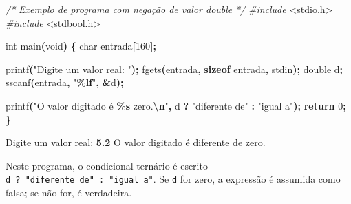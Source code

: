 \documentclass[
  11pt,
  a4paper,
]{scrbook}
\newenvironment{Shaded}{\begin{snugshade}}{\end{snugshade}}
\newcommand{\CommentTok}[1]{\textcolor[rgb]{0.56,0.35,0.01}{\textit{#1}}}
\newcommand{\ControlFlowTok}[1]{\textcolor[rgb]{0.13,0.29,0.53}{\textbf{#1}}}
\newcommand{\DataTypeTok}[1]{\textcolor[rgb]{0.13,0.29,0.53}{#1}}
\newcommand{\DecValTok}[1]{\textcolor[rgb]{0.00,0.00,0.81}{#1}}
\newcommand{\ImportTok}[1]{#1}
\newcommand{\KeywordTok}[1]{\textcolor[rgb]{0.13,0.29,0.53}{\textbf{#1}}}
\newcommand{\NormalTok}[1]{#1}
\newcommand{\OperatorTok}[1]{\textcolor[rgb]{0.81,0.36,0.00}{\textbf{#1}}}
\newcommand{\PreprocessorTok}[1]{\textcolor[rgb]{0.56,0.35,0.01}{\textit{#1}}}
\newcommand{\SpecialCharTok}[1]{\textcolor[rgb]{0.81,0.36,0.00}{\textbf{#1}}}
\newcommand{\StringTok}[1]{\textcolor[rgb]{0.31,0.60,0.02}{#1}}
\begin{document}
\begin{Shaded}
\begin{Highlighting}[]
\CommentTok{/*}
\CommentTok{Exemplo de programa com negação de valor double}
\CommentTok{*/}
\PreprocessorTok{\#include }\ImportTok{\textless{}stdio.h\textgreater{}}
\PreprocessorTok{\#include }\ImportTok{\textless{}stdbool.h\textgreater{}}

\DataTypeTok{int}\NormalTok{ main}\OperatorTok{(}\DataTypeTok{void}\OperatorTok{)} \OperatorTok{\{}
    \DataTypeTok{char}\NormalTok{ entrada}\OperatorTok{[}\DecValTok{160}\OperatorTok{];}

\NormalTok{    printf}\OperatorTok{(}\StringTok{"Digite um valor real: "}\OperatorTok{);}
\NormalTok{    fgets}\OperatorTok{(}\NormalTok{entrada}\OperatorTok{,} \KeywordTok{sizeof}\NormalTok{ entrada}\OperatorTok{,}\NormalTok{ stdin}\OperatorTok{);}
    \DataTypeTok{double}\NormalTok{ d}\OperatorTok{;}
\NormalTok{    sscanf}\OperatorTok{(}\NormalTok{entrada}\OperatorTok{,} \StringTok{"}\SpecialCharTok{\%lf}\StringTok{"}\OperatorTok{,} \OperatorTok{\&}\NormalTok{d}\OperatorTok{);}

\NormalTok{    printf}\OperatorTok{(}\StringTok{"O valor digitado é }\SpecialCharTok{\%s}\StringTok{ zero.}\SpecialCharTok{\textbackslash{}n}\StringTok{"}\OperatorTok{,}\NormalTok{ d }\OperatorTok{?} \StringTok{"diferente de"} \OperatorTok{:} \StringTok{"igual a"}\OperatorTok{);}
    \ControlFlowTok{return} \DecValTok{0}\OperatorTok{;}
\OperatorTok{\}}
\end{Highlighting}
\end{Shaded}

\begin{Shaded}
\begin{Highlighting}[]
\NormalTok{Digite um valor real: }\KeywordTok{ 5.2 }
\NormalTok{O valor digitado é diferente de zero.}
\end{Highlighting}
\end{Shaded}

Neste programa, o condicional ternário é escrito
\texttt{d\ ?\ "diferente\ de"\ :\ "igual\ a"}. Se \texttt{d} for zero, a
expressão é assumida como falsa; se não for, é verdadeira.
\end{document}
